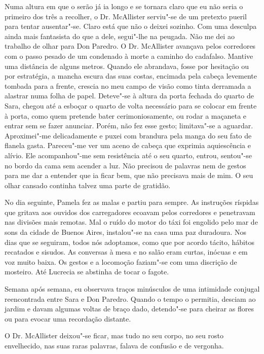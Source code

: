 Numa altura em que o serão já ia longo e se tornara claro que eu não
seria o primeiro dos três a recolher, o Dr. McAllister serviu"-se de um
pretexto pueril para tentar ausentar"-se. Claro está que não o deixei
sozinho. Com uma desculpa ainda mais fantasista do que a dele, segui"-lhe
na peugada. Não me dei ao trabalho de olhar para Don Paredro. O Dr.
McAllister avançava pelos corredores com o passo pesado de um condenado à morte a caminho do cadafalso. Mantive uma distância de alguns
metros. Quando ele abrandava, fosse por hesitação ou por estratégia, a
mancha escura das suas costas, encimada pela cabeça levemente tombada
para a frente, crescia no meu campo de visão como tinta derramada a
alastrar numa folha de papel. Deteve"-se à altura da porta fechada do
quarto de Sara, chegou até a esboçar o quarto de volta necessário para
se colocar em frente à porta, como quem pretende bater cerimoniosamente, ou rodar a maçaneta e entrar sem se fazer anunciar. Porém,
não fez esse gesto; limitava"-se a aguardar. Aproximei"-me delicadamente
e puxei com brandura pela manga do seu fato de flanela gasta. Pareceu"-me
ver um aceno de cabeça que exprimia aquiescência e alívio. Ele
acompanhou"-me sem resistência até o seu quarto, entrou, sentou"-se no
bordo da cama sem acender a luz. Não precisou de palavras nem de gestos para me dar a entender que ia ficar bem, que não precisava mais de
mim. O seu olhar cansado continha talvez uma parte de gratidão.

No dia seguinte, Pamela fez as malas e partiu para sempre. As
instruções ríspidas que gritava aos ouvidos dos carregadores ecoavam
pelos corredores e penetravam nas divisões mais remotas. Mal o ruído do
motor do táxi foi engolido pelo mar de sons da cidade de Buenos Aires,
instalou"-se na casa uma paz duradoura. Nos dias que se seguiram, todos
nós adoptamos, como que por acordo tácito, hábitos recatados e sisudos.
As conversas à mesa e no salão eram curtas, inócuas e em voz muito
baixa. Os gestos e a locomoção faziam"-se com uma discrição de mosteiro.
Até Lucrecia se abstinha de tocar o fagote.

Semana após semana, eu observava traços minúsculos de uma intimidade
conjugal reencontrada entre Sara e Don Paredro. Quando o tempo o
permitia, desciam ao jardim e davam algumas voltas de braço dado,
detendo"-se para cheirar as flores ou para evocar uma recordação
distante.

O Dr. McAllister deixou"-se ficar, mas tudo no seu corpo, no seu rosto
envelhecido, nas suas raras palavras, falava de confusão e de vergonha.

